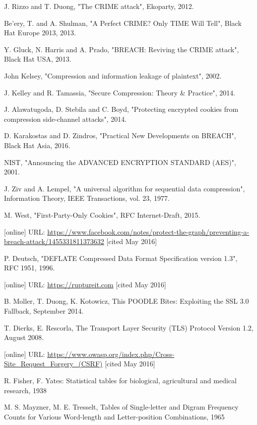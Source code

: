 \documentclass[conference, letterpaper, 10pt]{IEEEtran}
\begin{document}
\begin{thebibliography}{13}

 J. Rizzo and T. Duong, "The CRIME attack", Ekoparty, 2012.

 Be'ery, T. and A. Shulman, "A Perfect CRIME? Only TIME Will Tell",
Black Hat Europe 2013, 2013.

 Y. Gluck, N. Harris and A. Prado, "BREACH: Reviving the CRIME attack",
Black Hat USA, 2013.

 John Kelsey, "Compression and information leakage of plaintext", 2002.

 J. Kelley and R. Tamassia, "Secure Compression: Theory \& Practice",
2014.

 J. Alawatugoda, D. Stebila and C. Boyd, "Protecting encrypted
cookies from compression side-channel attacks", 2014.

 D. Karakostas and D. Zindros, "Practical New Developments on
BREACH", Black Hat Asia, 2016.

 NIST, "Announcing the ADVANCED ENCRYPTION STANDARD (AES)", 2001.

 J. Ziv and A. Lempel, "A universal algorithm for sequential data
compression", Information Theory, IEEE Transactions, vol. 23, 1977.

 M. West, "First-Party-Only Cookies", RFC Internet-Draft, 2015.

 [online] URL:
\url{https://www.facebook.com/notes/protect-the-graph/preventing-a-breach-attack/1455331811373632}
[cited May 2016]

 P. Deutsch, "DEFLATE Compressed Data Format Specification version
1.3", RFC 1951, 1996.

 [online] URL: \url{https://ruptureit.com} [cited May 2016]

 B. Moller, T. Duong, K. Kotowicz, This POODLE Bites: Exploiting the SSL 3.0 Fallback, September 2014.

 T. Dierks, E. Rescorla, The Transport Layer Security (TLS)
Protocol Version 1.2, August 2008.

 [online] URL:
\url{https://www.owasp.org/index.php/Cross-Site_Request_Forgery_(CSRF)} [cited May 2016]

 R. Fisher, F. Yates: Statistical tables for biological,
agricultural and medical research, 1938

 M. S. Mayzner, M. E. Tresselt, Tables of Single-letter and Digram
Frequency Counts for Various Word-length and Letter-position Combinations, 1965

\end{thebibliography}
\end{document}
